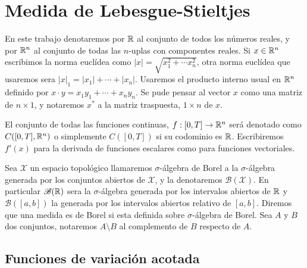 \chapter{Medida de Lebesgue-Stieltjes}




En este trabajo denotaremos por $\mathbb{R}$ al conjunto de todos los números reales, y por $\mathbb{R}^n$ al conjunto de todas las $n$-uplas con componentes reales.  Si $x\in \mathbb{R}^n$ escribimos la norma euclídea como $|x|=\sqrt{x_1^2+\cdots x_n^2}$, otra norma euclídea que usaremos sera $|x|_1=|x_1|+\cdots +|x_n|$.   Usaremos el producto interno usual en $\mathbb{R}^n $ definido por  $x\cdot y=x_1y_1 + \cdots+
x_ny_n$. Se pude pensar al vector $x$ como una matriz de $n\times 1$, y notaremos $x^*$ a la matriz traspuesta, $1\times n$ de $x$.

El conjunto de todas las funciones continuas, $f:[0,T]\to \mathbb{R}^n$ será denotado como $C([0,T],\mathbb{R}^n)$ o simplemente $C([0,T])$ si su codominio es $\mathbb{R}$.    Escribiremos $f'(x)$ para la derivada de funciones escalares como para funciones vectoriales. 

Sea $\mathcal{X}$ un espacio topológico llamaremos $\sigma$-álgebra  de Borel a la $\sigma$-álgebra generada por los conjuntos abiertos de $\mathcal{X}$, y la  denotaremos $\mathscr{B}(\mathcal{X})$. 
En particular $\mathscr{B}(\mathbb{R})$ sera la $\sigma$-álgebra generada por los intervalos abiertos de $\mathbb{R}$ y $\mathscr{B}([a,b])$ la generada por los intervalos abiertos relativo de $[a,b]$. Diremos que una medida es de Borel si esta definida sobre $\sigma$-álgebra de Borel.
Sea $A$ y $B$ dos conjuntos, notaremos $A\setminus B$ al complemento de $B$ respecto de $A$.




\section{Funciones de variación acotada}




